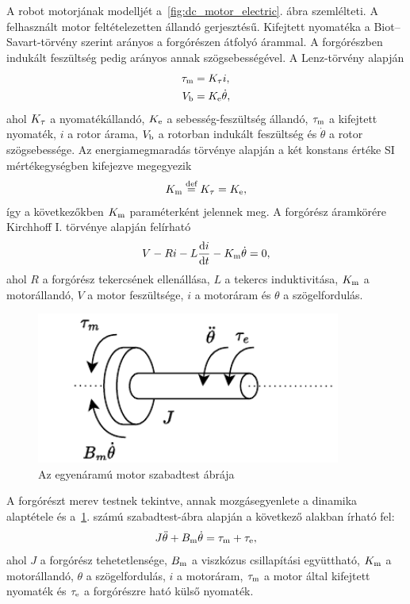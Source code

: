A robot motorjának modelljét a~\ref{fig:dc_motor_electric}. ábra szemlélteti. 
A felhasznált motor feltételezetten állandó gerjesztésű. Kifejtett nyomatéka a 
Biot--Savart-törvény szerint arányos a forgórészen átfolyó árammal. A forgórészben
indukált feszültség pedig arányos annak szögsebességével. A Lenz-törvény alapján 
\begin{equation}
\begin{split}
    \tau_{\mathrm{m}} &= K_{\mathrm{\tau}} i, \\
    V_{\mathrm{b}} &= K_{\mathrm{e}} \dot\theta,
\end{split}
\end{equation}
ahol $K_{\mathrm{\tau}}$ a nyomatékállandó, $K_{\mathrm{e}}$ a sebesség-feszültség állandó, $\tau_{\mathrm{m}}$ a kifejtett 
nyomaték, $i$ a rotor árama, $V_{\mathrm{b}}$ a rotorban indukált feszültség és $\dot\theta$ a rotor szögsebessége.
Az energiamegmaradás törvénye alapján a két konstans értéke SI mértékegységben kifejezve megegyezik
\begin{align}
    K_{\mathrm{m}} \stackrel{\text{def}}{=} K_{\mathrm{\tau}} = K_{\mathrm{e}},
\end{align}
így a következőkben $K_{\mathrm{m}}$ paraméterként jelennek meg. A forgórész áramkörére Kirchhoff I. törvénye alapján felírható
\begin{align}\label{eq:armature_circuit}
    V - Ri - L\frac{\mathrm{d} i}{\mathrm{d} t} - K_{\mathrm{m}}\dot\theta = 0,
\end{align}
ahol $R$ a forgórész tekercsének ellenállása, $L$ a tekercs induktivitása, 
$K_{\mathrm{m}}$ a motorállandó, $V$ a motor feszültsége, $i$ a motoráram és $\theta$ a szögelfordulás.
\begin{figure}[h]
    \begin{center}
    \includegraphics[width=10cm]{images/motor_model_mechanical.pdf}
    \caption{Az egyenáramú motor szabadtest ábrája}
    \label{fig:dc_motor_mechanical}
    \end{center}
\end{figure}
A forgórészt merev testnek tekintve, annak mozgásegyenlete a dinamika alaptétele és a~\ref{fig:dc_motor_mechanical}. számú 
szabadtest-ábra alapján a következő alakban írható fel:
\begin{align}\label{eq:rotor_dynamics}
    J\ddot\theta + B_{\mathrm{m}}\dot\theta = \tau_{\mathrm{m}} + \tau_{\mathrm{e}},
\end{align}
ahol $J$ a forgórész tehetetlensége, $B_{\mathrm{m}}$ a viszkózus csillapítási együttható, 
$K_{\mathrm{m}}$ a motorállandó, $\theta$ a szögelfordulás, $i$ a motoráram, $\tau_{\mathrm{m}}$ a motor által kifejtett nyomaték 
és $\tau_{\mathrm{e}}$ a forgórészre ható külső nyomaték. 
    

